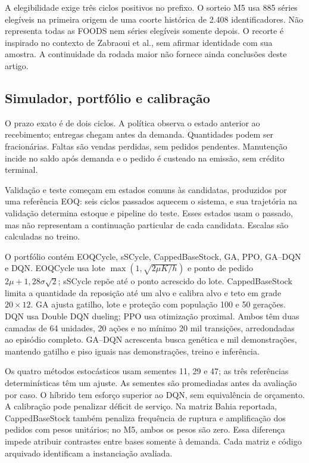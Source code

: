 \documentclass[preprint,12pt]{elsarticle}
\begin{document}
A elegibilidade exige três ciclos positivos no prefixo. O sorteio M5 usa 885 séries elegíveis na primeira origem de uma coorte histórica de 2.408 identificadores. Não representa todas as FOODS nem séries elegíveis somente depois. O recorte é inspirado no contexto de Zabraoui et al., sem afirmar identidade com sua amostra. A continuidade da rodada maior não fornece ainda conclusões deste artigo.

\subsection{Simulador, portfólio e calibração}
O prazo exato é de dois ciclos. A política observa o estado anterior ao recebimento; entregas chegam antes da demanda. Quantidades podem ser fracionárias. Faltas são vendas perdidas, sem pedidos pendentes. Manutenção incide no saldo após demanda e o pedido é custeado na emissão, sem crédito terminal.

Validação e teste começam em estados comuns às candidatas, produzidos por uma referência EOQ: seis ciclos passados aquecem o sistema, e sua trajetória na validação determina estoque e pipeline do teste. Esses estados usam o passado, mas não representam a continuação particular de cada candidata. Escalas são calculadas no treino.

O portfólio contém EOQCycle, sSCycle, CappedBaseStock, GA, PPO, GA--DQN e DQN. EOQCycle usa lote $\max(1,\sqrt{2\mu K/h})$ e ponto de pedido $2\mu+1{,}28\sigma\sqrt2$; sSCycle repõe até o ponto acrescido do lote. CappedBaseStock limita a quantidade da reposição até um alvo e calibra alvo e teto em grade $20\times12$. GA ajusta gatilho, lote e proteção com população 100 e 50 gerações. DQN usa Double DQN dueling; PPO usa otimização proximal. Ambos têm duas camadas de 64 unidades, 20 ações e no mínimo 20 mil transições, arredondadas ao episódio completo. GA--DQN acrescenta busca genética e mil demonstrações, mantendo gatilho e piso iguais nas demonstrações, treino e inferência.

Os quatro métodos estocásticos usam sementes 11, 29 e 47; as três referências determinísticas têm um ajuste. As sementes são promediadas antes da avaliação por caso. O híbrido tem esforço superior ao DQN, sem equivalência de orçamento. A calibração pode penalizar déficit de serviço. Na matriz Bahia reportada, CappedBaseStock também penaliza frequência de ruptura e amplificação dos pedidos com pesos unitários; no M5, ambos os pesos são zero. Essa diferença impede atribuir contrastes entre bases somente à demanda. Cada matriz e código arquivado identificam a instanciação avaliada.
\end{document}
